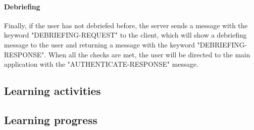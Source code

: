 \paragraph{Debriefing} Finally, if the user has not debriefed before, the server sends a message with the keyword "DEBRIEFING-REQUEST" to the client, which will show a debriefing message to the user and returning a message with the keyword "DEBRIEFING-RESPONSE". When all the checks are met, the user will be directed to the main application with the "AUTHENTICATE-RESPONSE" message.

\subsection{Learning activities}

\subsection{Learning progress}
